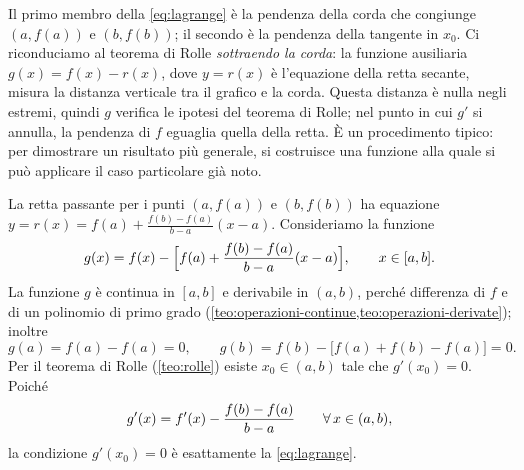\begin{schema}
\end{schema}

\begin{strategia}
Il primo membro della \eqref{eq:lagrange} è la pendenza della corda che congiunge
$(a,f(a))$ e $(b,f(b))$; il secondo è la pendenza della tangente in $x_{0}$. Ci
riconduciamo al teorema di Rolle \emph{sottraendo la corda}: la funzione ausiliaria
$g(x)=f(x)-r(x)$, dove $y=r(x)$ è l'equazione della retta secante, misura la distanza
verticale tra il grafico e la corda. Questa distanza è nulla negli estremi, quindi $g$
verifica le ipotesi del teorema di Rolle; nel punto in cui $g'$ si annulla, la
pendenza di $f$ eguaglia quella della retta. È un procedimento tipico: per dimostrare
un risultato più generale, si costruisce una funzione alla quale si può applicare il
caso particolare già noto.
\end{strategia}

\begin{dimostrazione}
La retta passante per i punti $(a,f(a))$ e $(b,f(b))$ ha equazione
$y=r(x)=f(a)+\frac{f(b)-f(a)}{b-a}(x-a)$. Consideriamo la funzione
\begin{equation}\label{eq:lagrange-g}
  g(x)=f(x)-\Bigl[f(a)+\frac{f(b)-f(a)}{b-a}(x-a)\Bigr], \qquad x\in[a,b].
\end{equation}
La funzione $g$ è continua in $[a,b]$ e derivabile in $(a,b)$, perché differenza di $f$
e di un polinomio di primo grado (\cref{teo:operazioni-continue,teo:operazioni-derivate});
inoltre
\[
  g(a)=f(a)-f(a)=0, \qquad g(b)=f(b)-\bigl[f(a)+f(b)-f(a)\bigr]=0 .
\]
Per il teorema di Rolle (\cref{teo:rolle}) esiste $x_{0}\in(a,b)$ tale che
$g'(x_{0})=0$. Poiché
\[
  g'(x)=f'(x)-\frac{f(b)-f(a)}{b-a} \qquad\forall\, x\in(a,b),
\]
la condizione $g'(x_{0})=0$ è esattamente la \eqref{eq:lagrange}.
\end{dimostrazione}

